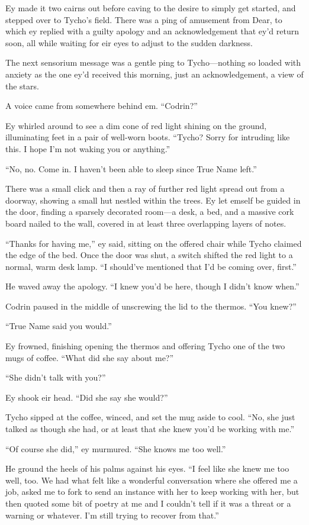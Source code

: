 Ey made it two cairns out before caving to the desire to simply get started, and stepped over to Tycho's field. There was a ping of amusement from Dear, to which ey replied with a guilty apology and an acknowledgement that ey'd return soon, all while waiting for eir eyes to adjust to the sudden darkness.

The next sensorium message was a gentle ping to Tycho—nothing so loaded with anxiety as the one ey'd received this morning, just an acknowledgement, a view of the stars.

A voice came from somewhere behind em. ``Codrin?''

Ey whirled around to see a dim cone of red light shining on the ground, illuminating feet in a pair of well-worn boots. ``Tycho? Sorry for intruding like this. I hope I'm not waking you or anything.''

``No, no. Come in. I haven't been able to sleep since True Name left.''

There was a small click and then a ray of further red light spread out from a doorway, showing a small hut nestled within the trees. Ey let emself be guided in the door, finding a sparsely decorated room—a desk, a bed, and a massive cork board nailed to the wall, covered in at least three overlapping layers of notes.

``Thanks for having me,'' ey said, sitting on the offered chair while Tycho claimed the edge of the bed. Once the door was shut, a switch shifted the red light to a normal, warm desk lamp. ``I should've mentioned that I'd be coming over, first.''

He waved away the apology. ``I knew you'd be here, though I didn't know when.''

Codrin paused in the middle of unscrewing the lid to the thermos. ``You knew?''

``True Name said you would.''

Ey frowned, finishing opening the thermos and offering Tycho one of the two mugs of coffee. ``What did she say about me?''

``She didn't talk with you?''

Ey shook eir head. ``Did she say she would?''

Tycho sipped at the coffee, winced, and set the mug aside to cool. ``No, she just talked as though she had, or at least that she knew you'd be working with me.''

``Of course she did,'' ey murmured. ``She knows me too well.''

He ground the heels of his palms against his eyes. ``I feel like she knew me too well, too. We had what felt like a wonderful conversation where she offered me a job, asked me to fork to send an instance with her to keep working with her, but then quoted some bit of poetry at me and I couldn't tell if it was a threat or a warning or whatever. I'm still trying to recover from that.''

